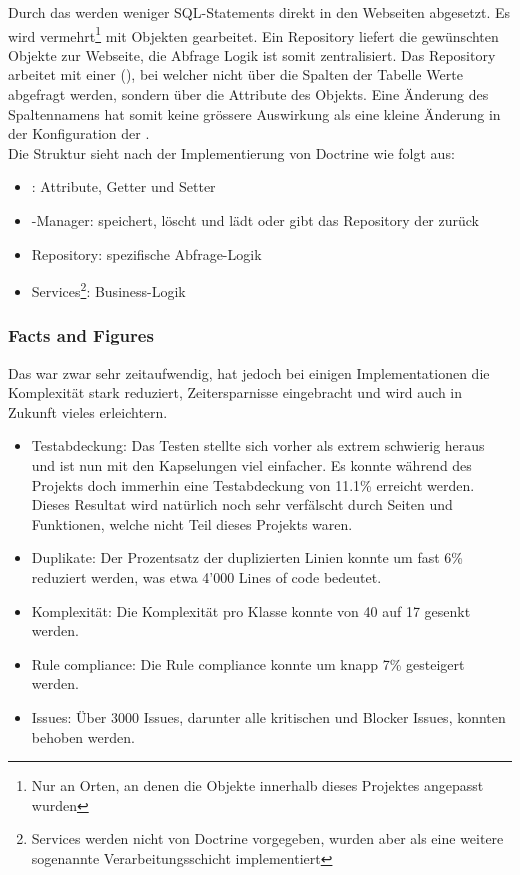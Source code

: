 \FloatBarrier
Durch das  werden weniger SQL-Statements direkt in den Webseiten abgesetzt. Es wird vermehrt\footnote{Nur an Orten, an denen die Objekte innerhalb dieses Projektes angepasst wurden} mit Objekten gearbeitet. Ein Repository liefert die gewünschten Objekte zur Webseite, die Abfrage Logik ist somit zentralisiert. Das Repository arbeitet mit einer  (), bei welcher nicht über die Spalten der Tabelle Werte abgefragt werden, sondern über die Attribute des Objekts. Eine Änderung des Spaltennamens hat somit keine grössere Auswirkung als eine kleine Änderung in der Konfiguration der .\\

Die Struktur sieht nach der Implementierung von Doctrine wie folgt aus:
\begin{itemize}
\item {}: Attribute, Getter und Setter
\item {}-Manager: speichert, löscht und lädt  oder gibt das Repository der  zurück
\item Repository: spezifische Abfrage-Logik
\item Services\footnote{Services werden nicht von Doctrine vorgegeben, wurden aber als eine weitere sogenannte Verarbeitungsschicht implementiert}: Business-Logik
\end{itemize}

\newpage
\subsubsection{Facts and Figures}
Das  war zwar sehr zeitaufwendig, hat jedoch bei einigen Implementationen die Komplexität stark reduziert, Zeitersparnisse eingebracht und wird auch in Zukunft vieles erleichtern.
\begin{itemize}
\item Testabdeckung: Das Testen stellte sich vorher als extrem schwierig heraus und ist nun mit den Kapselungen viel einfacher. Es konnte während des Projekts doch immerhin eine Testabdeckung von 11.1\% erreicht werden. Dieses Resultat wird natürlich noch sehr verfälscht durch Seiten und Funktionen, welche nicht Teil dieses Projekts waren.
\item Duplikate: Der Prozentsatz der duplizierten Linien konnte um fast 6\% reduziert werden, was etwa 4'000 Lines of code bedeutet.
\item Komplexität: Die Komplexität pro Klasse konnte von 40 auf 17 gesenkt werden.
\item Rule compliance: Die Rule compliance konnte um knapp 7\% gesteigert werden.
\item Issues: Über 3000 Issues, darunter alle kritischen und Blocker Issues, konnten behoben werden.
\end{itemize}


